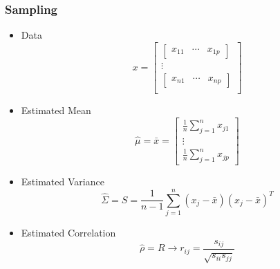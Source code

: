 \documentclass[aspectratio=169,10pt,t]{beamer}
\begin{document}
\begin{frame}[t]
    \frametitle{Sampling}
    \begin{itemize}
        \item Data
            \[
                x = 
                \begin{bmatrix}
                    \begin{bmatrix}
                        x_{11} & \cdots & x_{1p}
                    \end{bmatrix}\\
                    \vdots\\
                    \begin{bmatrix}
                        x_{n1} & \cdots & x_{np}
                    \end{bmatrix}\\
                \end{bmatrix}
            \] 
        \item Estimated Mean
            \[
                \hat{\mu} = \bar{x} = 
                \begin{bmatrix}
                    \frac{1}{n} \sum^{n}_{j=1} x_{j1}\\
                    \vdots\\
                    \frac{1}{n} \sum^{n}_{j=1} x_{jp}
                \end{bmatrix}
            \] 
        \item Estimated Variance
            \[
                \hat{\Sigma} = S = 
                \frac{1}{n-1} \sum^{n}_{j=1} 
                \left( x_j - \bar{x}  \right) 
                \left( x_j - \bar{x}  \right) ^{T}
            \] 
				\item Estimated Correlation
					\[
					\hat{\rho} = R
					\rightarrow
					r_{ij} = \frac{s_{ij}}{\sqrt{s_{ii} s_{jj}}} 
					\] 
    \end{itemize}
\end{frame}
\end{document}
